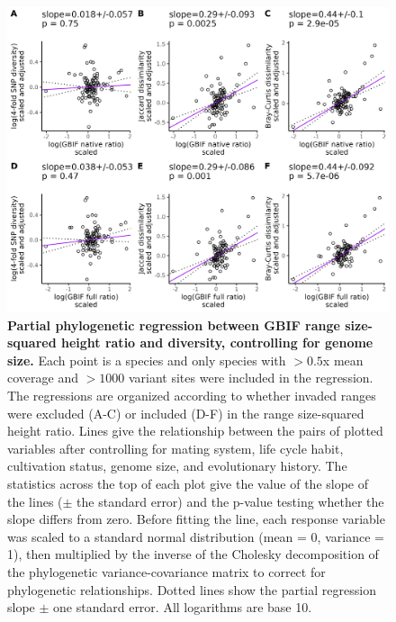 \documentclass[12pt]{article}
\begin{document}
\begin{figure}[H]
    \centering
    \includegraphics[width=\textwidth]{figures/appendix_d/gbif_popsize_vs_diversity_genome-size-corrected_2024-12-12.jpg}
    \caption{\textbf{Partial phylogenetic regression between GBIF range size-squared height ratio and diversity, controlling for genome size.} Each point is a species and only species with $>0.5$x mean coverage and $>1000$ variant sites were included in the regression. The regressions are organized according to whether invaded ranges were excluded (A-C) or included (D-F) in the range size-squared height ratio. Lines give the relationship between the pairs of plotted variables after controlling for mating system, life cycle habit, cultivation status, genome size, and evolutionary history. The statistics across the top of each plot give the value of the slope of the lines ($\pm$ the standard error) and the p-value testing whether the slope differs from zero. Before fitting the line, each response variable was scaled to a standard normal distribution (mean = 0, variance = 1), then multiplied by the inverse of the Cholesky decomposition of the phylogenetic variance-covariance matrix to correct for phylogenetic relationships. Dotted lines show the partial regression slope $\pm$ one standard error. All logarithms are base 10.}
\end{figure}
\end{document}
